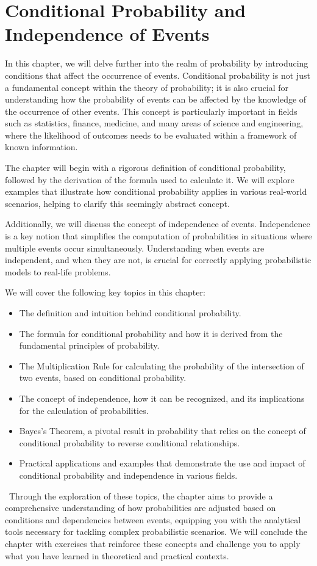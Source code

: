 \chapterspaceabove{6.75cm} 
\chapterspacebelow{8.25cm} 
\chapter{Conditional Probability and Independence of Events}

In this chapter, we will delve further into the realm of probability by introducing conditions that affect the occurrence of events. Conditional probability is not just a fundamental concept within the theory of probability; it is also crucial for understanding how the probability of events can be affected by the knowledge of the occurrence of other events. This concept is particularly important in fields such as statistics, finance, medicine, and many areas of science and engineering, where the likelihood of outcomes needs to be evaluated within a framework of known information.

The chapter will begin with a rigorous definition of conditional probability, followed by the derivation of the formula used to calculate it. We will explore examples that illustrate how conditional probability applies in various real-world scenarios, helping to clarify this seemingly abstract concept.

Additionally, we will discuss the concept of independence of events. Independence is a key notion that simplifies the computation of probabilities in situations where multiple events occur simultaneously. Understanding when events are independent, and when they are not, is crucial for correctly applying probabilistic models to real-life problems.

We will cover the following key topics in this chapter:
\begin{itemize}
    \item The definition and intuition behind conditional probability.
    \item The formula for conditional probability and how it is derived from the fundamental principles of probability.
    \item The Multiplication Rule for calculating the probability of the intersection of two events, based on conditional probability.
    \item The concept of independence, how it can be recognized, and its implications for the calculation of probabilities.
    \item Bayes's Theorem, a pivotal result in probability that relies on the concept of conditional probability to reverse conditional relationships.
    \item Practical applications and examples that demonstrate the use and impact of conditional probability and independence in various fields.
\end{itemize}
\
Through the exploration of these topics, the chapter aims to provide a comprehensive understanding of how probabilities are adjusted based on conditions and dependencies between events, equipping you with the analytical tools necessary for tackling complex probabilistic scenarios. We will conclude the chapter with exercises that reinforce these concepts and challenge you to apply what you have learned in theoretical and practical contexts.

